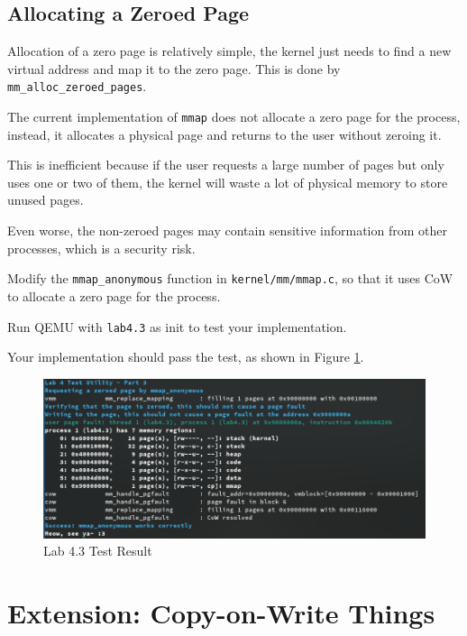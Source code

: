\subsection{Allocating a Zeroed Page}

Allocation of a zero page is relatively simple, the kernel just needs to
find a new virtual address and map it to the zero page. This is done by
\texttt{mm\_alloc\_zeroed\_pages}.

The current implementation of \texttt{mmap} does not allocate a zero page
for the process, instead, it allocates a physical page and returns to
the user without zeroing it.

This is inefficient because if the user requests a large number of pages but
only uses one or two of them, the kernel will waste a lot of physical memory
to store unused pages.

Even worse, the non-zeroed pages may contain sensitive information from
other processes, which is a security risk.

\begin{exercise}
    \item Modify the \texttt{mmap\_anonymous} function in \texttt{kernel/mm/mmap.c},
    so that it uses CoW to allocate a zero page for the process.
    \item Run QEMU with \texttt{lab4.3} as init to test your implementation.

    Your implementation should pass the test, as shown in Figure \ref{fig:lab4.3}.

    \begin{figure}[H]
        \centering
        \includegraphics[width=0.8\linewidth]{assets/c4.mmap.png}
        \caption{Lab 4.3 Test Result}
        \label{fig:lab4.3}
    \end{figure}
\end{exercise}

\section{Extension: Copy-on-Write Things}

